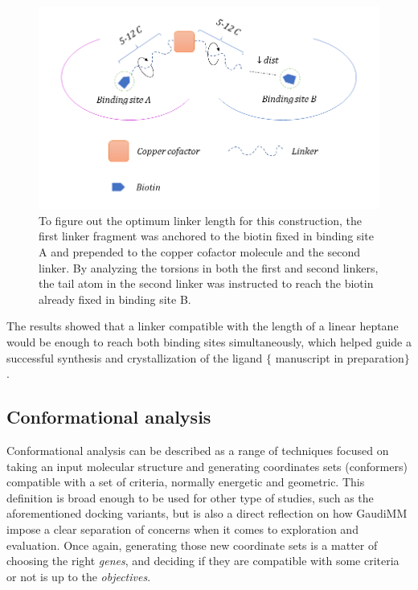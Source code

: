 \begin{figure}[H] %
	\begin{Center}
		\includegraphics[width=\textwidth]{./figures/06/dibiotin-scheme.png}
	\end{Center}
	\caption[Linker length optimization]{To figure out the optimum linker length for this construction, the first linker fragment was anchored to the biotin fixed in binding site A and prepended to the copper cofactor molecule and the second linker. By analyzing the torsions in both the first and second linkers, the tail atom in the second linker was instructed to reach the biotin already fixed in binding site B.}
	\label{fig:dibiotin-linker-length}
\end{figure}

The results showed that a linker compatible with the length of a linear heptane would be enough to reach both binding sites simultaneously, which helped guide a successful synthesis and crystallization of the ligand $ \{ $ manuscript in preparation$ \} $ .

\subsection{Conformational analysis}
\label{section:siderophore}
Conformational analysis can be described as a range of techniques focused on taking an input molecular structure and generating coordinates sets (conformers) compatible with a set of criteria, normally energetic and geometric. This definition is broad enough to be used for other type of studies, such as the aforementioned docking variants, but is also a direct reflection on how GaudiMM impose a clear separation of concerns when it comes to exploration and evaluation. Once again, generating those new coordinate sets is a matter of choosing the right \textit{genes}, and deciding if they are compatible with some criteria or not is up to the \textit{objectives}.

